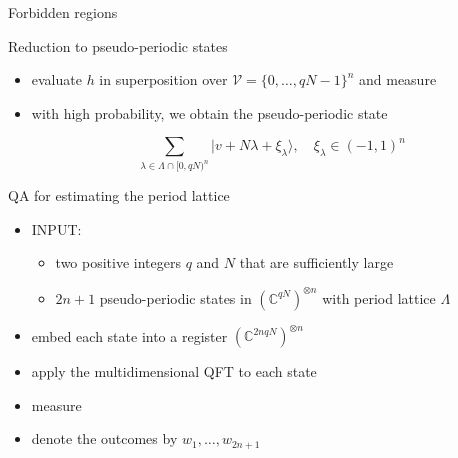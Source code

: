 \documentclass[slideColor]{prosper}
\renewcommand{\>}{\rangle}
\newcommand{\<}{\langle}
\begin{document}
\begin{slide}{Forbidden regions}

\end{slide}


\begin{slide}{Reduction to pseudo-periodic states}

\begin{itemize}
\item evaluate $h$ in superposition over $\mathcal{V}=\{0,\ldots,qN-1\}^n$ and measure 

\medskip
\item with high probability, we obtain the pseudo-periodic state

\[
\sum_{\lambda\in\Lambda\cap [0,qN)^n} | v + N \lambda + \xi_\lambda\>, \quad \xi_\lambda\in (-1,1)^n
\]

\end{itemize}

\end{slide}


\begin{slide}{QA for estimating the period lattice}

\begin{itemize}

\item INPUT:

\begin{itemize}
\item two positive integers $q$ and $N$ that are sufficiently large

\medskip
\item $2n+1$ pseudo-periodic states in ${(\mathbb{C}^{qN})}^{\otimes n}$ with period lattice $\Lambda$
\end{itemize}

\medskip
\item embed each state into a register ${(\mathbb{C}^{2nqN})}^{\otimes n}$

\medskip
\item apply the multidimensional QFT to each state

\medskip
\item measure 

\medskip
\item denote the outcomes by $w_1,\ldots,w_{2n+1}$

\end{itemize}
\end{slide}
\end{document}

